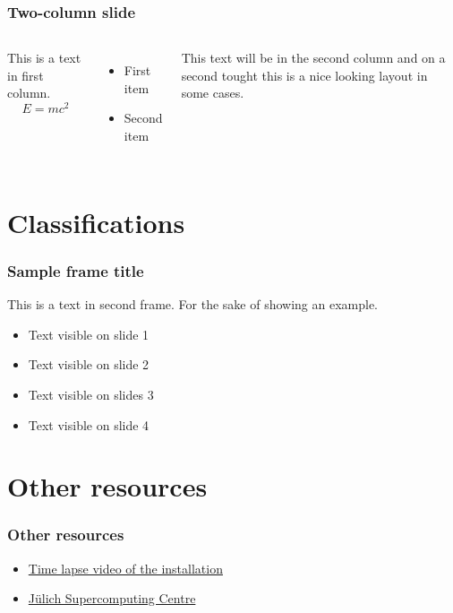 \documentclass{beamer}
\begin{document}
\begin{frame}
  \frametitle{Two-column slide}

  \begin{columns}

    This is a text in first column.
    $$E=mc^2$$
    \begin{itemize}
      \item First item
      \item Second item
    \end{itemize}

    This text will be in the second column
    and on a second tought this is a nice looking
    layout in some cases.
  \end{columns}
\end{frame}

\section{Classifications}

\begin{frame}
  \frametitle{Sample frame title}
  This is a text in second frame. For the sake of showing an example.

  \begin{itemize}
    \item<1-> Text visible on slide 1
    \item<2-> Text visible on slide 2
    \item<3> Text visible on slides 3
    \item<4-> Text visible on slide 4
  \end{itemize}
\end{frame}



\section{Other resources}

\begin{frame}
  \frametitle{Other resources}

  \begin{itemize}
    \item \href{https://www.youtube.com/watch?v=7h6mYU2HDTA}{Time lapse video of the installation}
    \item \href{https://www.fz-juelich.de/ias/jsc/EN/Home/home_node.html}{Jülich Supercomputing Centre}
  \end{itemize}
\end{frame}

\end{document}
